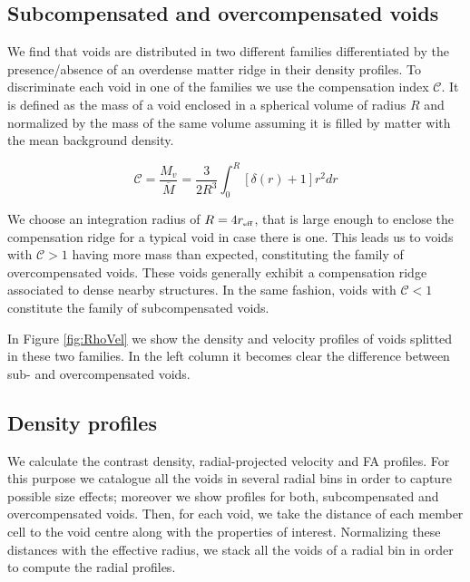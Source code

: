 \documentclass[a4,useAMS,usenatbib,usegraphicx]{mn2e}
\newcommand{\eq}[2]{\begin{equation} \label{eq:#1} #2 \end{equation}}
\newcommand{\reff}{{\ifmmode{r_{\mbox{\tiny eff}}}\else{$r_{\mbox{\tiny eff}}$}\fi}}
\begin{document}
\subsection{Subcompensated and overcompensated voids}
\label{subsec:enclosedmass}

We find that voids are distributed in two different  families
differentiated by the 
presence/absence of an overdense matter ridge in their density
profiles. 
To discriminate each void in one of the families we use the
compensation  index $\mathcal{C}$.
It is defined as the mass of a void enclosed in a spherical volume of
radius $R$ and normalized by the mass of the same volume assuming
it is filled by matter with the mean background density.

\eq{compensation}
{\mathcal{C} = \frac{M_v}{\overline{M}} = \frac{3}{2R^{3}} \int_0^{R} [\delta(r) + 1] r^2 dr}

We choose an integration radius of $R=4\reff$, that is large enough to 
enclose the compensation ridge for a typical void in case there is one. 
This leads us to voids with $\mathcal{C}>1$ having more mass than expected, 
constituting the family of overcompensated voids. 
These voids generally  exhibit a compensation ridge associated to
dense nearby structures. 
In the same fashion, voids with $\mathcal{C}<1$ constitute the family
of  subcompensated voids. 

In Figure \ref{fig:RhoVel} we show the density and velocity profiles
of voids splitted in these two families. 
In the left column it becomes clear the difference between sub- and
overcompensated voids.

\subsection{Density profiles}
\label{subsec:density_voids}



We calculate the contrast density, radial-projected velocity and 
FA profiles. For this purpose we catalogue all the voids in several radial 
bins in order to capture possible size effects; moreover we show profiles 
for both, subcompensated and overcompensated voids. Then, for each void, 
we take the distance of each member cell to the void centre along with the 
properties of interest. Normalizing these distances with the effective 
radius, we stack all the voids of a radial bin in order to compute the 
radial profiles.
\end{document}
